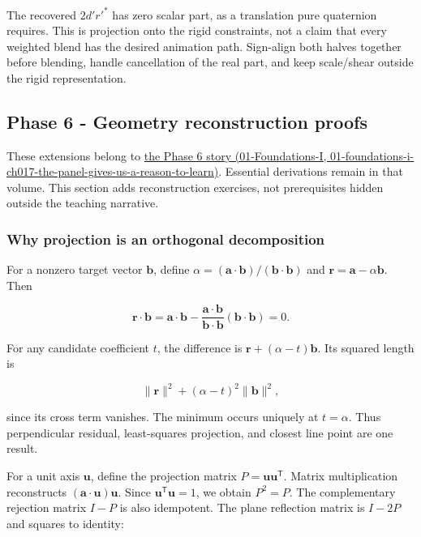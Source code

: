 The recovered \(2d'r'^*\) has zero scalar part, as a translation pure quaternion requires. This is projection onto the rigid constraints, not a claim that every weighted blend has the desired animation path. Sign-align both halves together before blending, handle cancellation of the real part, and keep scale/shear outside the rigid representation.

\subsection{Phase 6 - Geometry reconstruction proofs}\label{02-foundations-ii-ch039-phase-6---geometry-reconstruction-proofs}

These extensions belong to \href{../01-Foundations-I/main.pdf\#nameddest=01-foundations-i-ch017-the-panel-gives-us-a-reason-to-learn}{the Phase 6 story (01-Foundations-I, 01-foundations-i-ch017-the-panel-gives-us-a-reason-to-learn)}. Essential derivations remain in that volume. This section adds reconstruction exercises, not prerequisites hidden outside the teaching narrative.

\subsubsection{Why projection is an orthogonal decomposition}\label{02-foundations-ii-ch039-why-projection-is-an-orthogonal-decomposition}

For a nonzero target vector \(\mathbf b\), define \(\alpha=(\mathbf a\cdot\mathbf b)/(\mathbf b\cdot\mathbf b)\) and \(\mathbf r=\mathbf a-\alpha\mathbf b\). Then

\[
\mathbf r\cdot\mathbf b=\mathbf a\cdot\mathbf b-
\frac{\mathbf a\cdot\mathbf b}{\mathbf b\cdot\mathbf b}(\mathbf b\cdot\mathbf b)=0.
\]

For any candidate coefficient \(t\), the difference is \(\mathbf r+(\alpha-t)\mathbf b\). Its squared length is

\[
\|\mathbf r\|^2+(\alpha-t)^2\|\mathbf b\|^2,
\]

since its cross term vanishes. The minimum occurs uniquely at \(t=\alpha\). Thus perpendicular residual, least-squares projection, and closest line point are one result.

For a unit axis \(\mathbf u\), define the projection matrix \(P=\mathbf u\mathbf u^\mathsf T\). Matrix multiplication reconstructs \((\mathbf a\cdot\mathbf u)\mathbf u\). Since \(\mathbf u^\mathsf T\mathbf u=1\), we obtain \(P^2=P\). The complementary rejection matrix \(I-P\) is also idempotent. The plane reflection matrix is \(I-2P\) and squares to identity:

